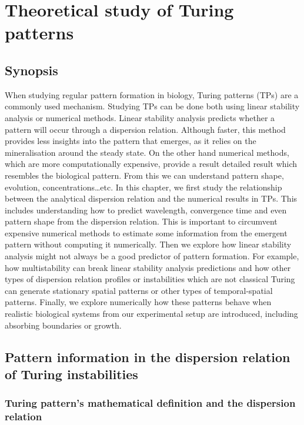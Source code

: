 \chapter{Theoretical study of Turing patterns }
\section{Synopsis}
When studying regular pattern formation in biology, Turing patterns (TPs) are a commonly used mechanism.
Studying TPs can be done both using linear stability analysis or numerical methods.
Linear stability analysis predicts whether a pattern will occur through a dispersion relation.
Although faster, this method provides less insights into the pattern that emerges, as it relies on the mineralisation around the steady state.
On the other hand numerical methods, which are more computationally expensive, provide a result detailed result which resembles the biological pattern. From this we can understand pattern shape, evolution, concentrations\ldots etc.
In this chapter, we first study the relationship between the analytical dispersion relation and the numerical results in TPs.
This includes understanding how to predict wavelength,
convergence time and even pattern shape from the dispersion relation.
This is important to circumvent expensive numerical methods to estimate some information from the emergent pattern without computing it numerically.
Then we explore how linear stability analysis might not always be a good predictor of pattern formation.
For example, how multistability can break linear stability analysis predictions and how other types of dispersion relation profiles or instabilities which are not classical Turing can generate stationary spatial patterns or other types of temporal-spatial patterns.
Finally, we explore numerically how these patterns behave when realistic biological systems from our experimental setup are introduced, including absorbing boundaries or growth.



\section{Pattern information in the dispersion relation of Turing instabilities}
\subsection{Turing pattern's mathematical definition and the dispersion relation}


